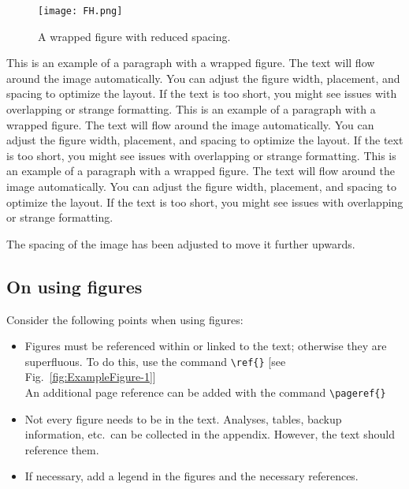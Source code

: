 

\begin{wrapfigure}{r}{0.4\textwidth}  %
    \vspace{-10pt}  %
    \centering
    \texttt{[image: FH.png]}
    \caption{A wrapped figure with reduced spacing.}
    \label{fig:wrapfig}
\end{wrapfigure}



This is an example of a paragraph with a wrapped figure. The text will flow around the image automatically. You can adjust the figure width, placement, and spacing to optimize the layout. If the text is too short, you might see issues with overlapping or strange formatting.
This is an example of a paragraph with a wrapped figure. The text will flow around the image automatically. You can adjust the figure width, placement, and spacing to optimize the layout. If the text is too short, you might see issues with overlapping or strange formatting.
This is an example of a paragraph with a wrapped figure. The text will flow around the image automatically. You can adjust the figure width, placement, and spacing to optimize the layout. If the text is too short, you might see issues with overlapping or strange formatting.

The spacing of the image has been adjusted to move it further upwards.

\subsection{On using figures}
Consider the following points when using figures:
\begin{itemize}
    \item Figures must be referenced within or linked to the text; otherwise they are superfluous. To do this, use the command \verb|\ref{}|
    [see Fig.~\ref{fig:ExampleFigure-1}]\\
    An additional page reference can be added with the command \verb|\pageref{}| 
    \item Not every figure needs to be in the text. Analyses, tables, backup information, etc.~can be collected in the appendix. However, the text should reference them.
    \item If necessary, add a legend in the figures and the necessary references.
\end{itemize}
